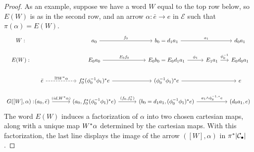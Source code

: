 \documentclass[a4paper,10pt
,draft
]{article}%
\renewcommand{\1}{\eta}%
\begin{document}
\begin{proof}
      As an example, suppose we have a word $W$ equal to the top row below, so $E(W)$ is as in the second row,
      and an arrow $\alpha: \bar e \to e$ in $\mathcal E$ such that $\pi(\alpha) = E(W)$.
      \begin{equation}
            \begin{tikzcd}[column sep = small]
                  W:
                  &[-20pt]
                  &[20pt]
                  a_0 \arrow[r, "f_0"]
                  &[20pt]
                  b_0 = d_1 a_1 \arrow[rr, "a_1"]
                  &&
                  d_0 a_1
                  \\
                  E(W):
                  &
                  &
                  E_0 a_0 \arrow[r, "E_0 f_0"] %
                  &
                  E_0 b_0 = E_0 d_1 a_1 \arrow[r, "\phi_1"]
                  &
                  E_1 a_1 \arrow[r, "{\phi_0^{-1}}"]
                  &
                  E_0 d_0 a_1 %
                  \\
                  &
                  \bar e \arrow[r, dashed, "{\exists ! W^{\**} \alpha}"]
                  &
                  f_0^{\**} (\phi_0^{-1} \phi_1)^{\**} e \arrow[r]
                  &
                  (\phi_0^{-1} \phi_1)^{\**} e \arrow[rr]
                  &&
                  e
                  \\
                  G([W], \alpha):
                  &
                  (a_0, \bar e) \arrow[r, "{(id, W^{\**} \alpha)}"]
                  &
                  (a_0, f_0^{\**} (\phi_0^{-1} \phi_1)^{\**} e) \arrow[r, "{(f_0, f_0^{\**})}"]
                  &
                  (b_0 = d_1 a_1, (\phi_0^{-1} \phi_1)^{\**} e) \arrow[rr, "a_1 \wedge \phi_0^{-1,\**} e"]
                  &&
                  (d_0 a_1, e)
            \end{tikzcd}
      \end{equation}
      The word $E(W)$ induces a factorization of $\alpha$ into two chosen cartesian maps, along with a unique map $W^{\**}\alpha$ determined by the cartesian maps.
      With this factorization, the last line displays the image of the arrow $([W], \alpha)$ in $\pi^{\**}|\mathcal C_\bullet|$. 
      

\end{proof}
\end{document}
